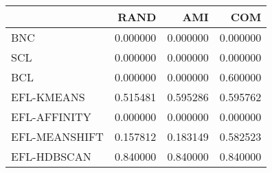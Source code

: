 \begin{tabular}{lrrr}
\toprule
 & RAND & AMI & COM \\
\midrule
BNC & 0.000000 & 0.000000 & 0.000000 \\
SCL & 0.000000 & 0.000000 & 0.000000 \\
BCL & 0.000000 & 0.000000 & 0.600000 \\
EFL-KMEANS & 0.515481 & 0.595286 & 0.595762 \\
EFL-AFFINITY & 0.000000 & 0.000000 & 0.000000 \\
EFL-MEANSHIFT & 0.157812 & 0.183149 & 0.582523 \\
EFL-HDBSCAN & 0.840000 & 0.840000 & 0.840000 \\
\bottomrule
\end{tabular}
